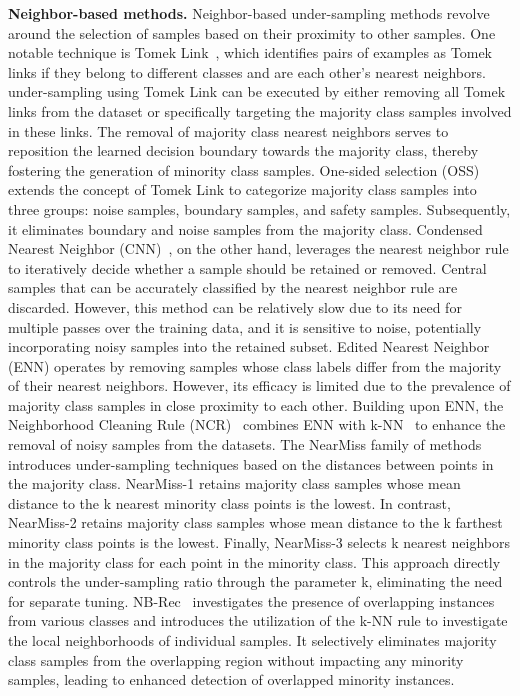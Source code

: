 \textbf{Neighbor-based methods.} Neighbor-based under-sampling methods revolve around the selection of samples based on their proximity to other samples. One notable technique is Tomek Link~\cite{kubat1997addressing}, which identifies pairs of examples as Tomek links if they belong to different classes and are each other's nearest neighbors. under-sampling using Tomek Link can be executed by either removing all Tomek links from the dataset or specifically targeting the majority class samples involved in these links. The removal of majority class nearest neighbors serves to reposition the learned decision boundary towards the majority class, thereby fostering the generation of minority class samples.
One-sided selection (OSS)~\cite{kubat1997addressing} extends the concept of Tomek Link to categorize majority class samples into three groups: noise samples, boundary samples, and safety samples. Subsequently, it eliminates boundary and noise samples from the majority class.
Condensed Nearest Neighbor (CNN)~\cite{ref_6}, on the other hand, leverages the nearest neighbor rule to iteratively decide whether a sample should be retained or removed. Central samples that can be accurately classified by the nearest neighbor rule are discarded. However, this method can be relatively slow due to its need for multiple passes over the training data, and it is sensitive to noise, potentially incorporating noisy samples into the retained subset.
Edited Nearest Neighbor (ENN)\cite{ref_17} operates by removing samples whose class labels differ from the majority of their nearest neighbors. However, its efficacy is limited due to the prevalence of majority class samples in close proximity to each other. Building upon ENN, the Neighborhood Cleaning Rule (NCR)~\cite{ref_18} combines ENN with k-NN~\cite{guo2003knn} to enhance the removal of noisy samples from the datasets.
The NearMiss family of methods~\cite{ref_19} introduces under-sampling techniques based on the distances between points in the majority class. NearMiss-1 retains majority class samples whose mean distance to the k nearest minority class points is the lowest. In contrast, NearMiss-2 retains majority class samples whose mean distance to the k farthest minority class points is the lowest. Finally, NearMiss-3 selects k nearest neighbors in the majority class for each point in the minority class. This approach directly controls the under-sampling ratio through the parameter k, eliminating the need for separate tuning.
NB-Rec~\cite{vuttipittayamongkol2020neighbourhood} investigates the presence of overlapping instances from various classes and introduces the utilization of the k-NN rule to investigate the local neighborhoods of individual samples. It selectively eliminates majority class samples from the overlapping region without impacting any minority samples, leading to enhanced detection of overlapped minority instances. 




